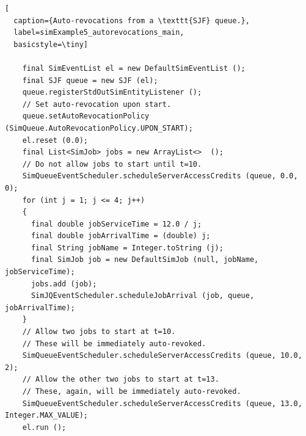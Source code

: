 \documentclass[12pt]{book}
\begin{document}
\begin{lstfloat}
\begin{lstlisting}[
  caption={Auto-revocations from a \texttt{SJF} queue.},
  label=simExample5_autorevocations_main,
  basicstyle=\tiny]

    final SimEventList el = new DefaultSimEventList ();
    final SJF queue = new SJF (el);
    queue.registerStdOutSimEntityListener ();
    // Set auto-revocation upon start.
    queue.setAutoRevocationPolicy (SimQueue.AutoRevocationPolicy.UPON_START);
    el.reset (0.0);
    final List<SimJob> jobs = new ArrayList<>  ();
    // Do not allow jobs to start until t=10.
    SimQueueEventScheduler.scheduleServerAccessCredits (queue, 0.0, 0);
    for (int j = 1; j <= 4; j++)
    {
      final double jobServiceTime = 12.0 / j;
      final double jobArrivalTime = (double) j;
      final String jobName = Integer.toString (j);
      final SimJob job = new DefaultSimJob (null, jobName, jobServiceTime);
      jobs.add (job);
      SimJQEventScheduler.scheduleJobArrival (job, queue, jobArrivalTime);
    }
    // Allow two jobs to start at t=10.
    // These will be immediately auto-revoked.
    SimQueueEventScheduler.scheduleServerAccessCredits (queue, 10.0, 2);
    // Allow the other two jobs to start at t=13.
    // These, again, will be immediately auto-revoked.
    SimQueueEventScheduler.scheduleServerAccessCredits (queue, 13.0, Integer.MAX_VALUE);    
    el.run ();

\end{lstlisting}
\end{lstfloat}
\end{document}
